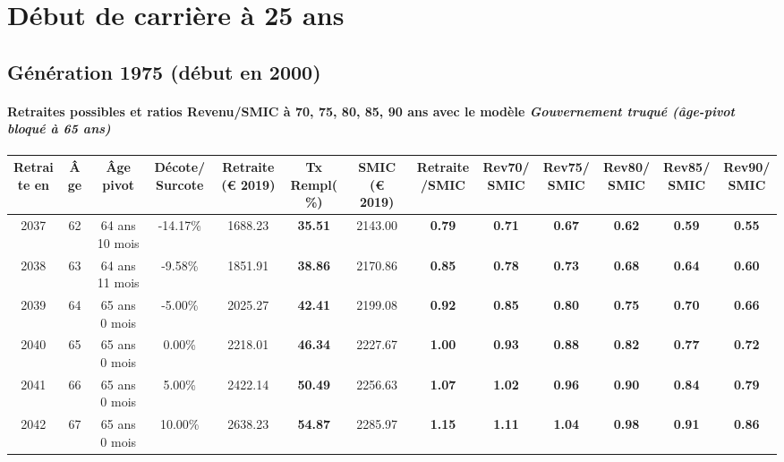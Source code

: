  \addto{\captionsenglish}{ \renewcommand{\mtctitle}{}} \setcounter{minitocdepth}{2} 
 \minitoc \newpage 

\section{Début de carrière à 25 ans} 

\subsection{Génération 1975 (début en 2000)} 

\paragraph{Retraites possibles et ratios Revenu/SMIC à 70, 75, 80, 85, 90 ans avec le modèle \emph{Gouvernement truqué (âge-pivot bloqué à 65 ans)}}  
 
{ \scriptsize \begin{center} 
\begin{tabular}[htb]{|c|c||c|c||c|c||c||c|c|c|c|c|c|} 
\hline 
 Retraite en &  Âge &  Âge pivot &  Décote/Surcote &  Retraite (\euro{} 2019) &  Tx Rempl(\%) &  SMIC (\euro{} 2019) &  Retraite/SMIC &  Rev70/SMIC &  Rev75/SMIC &  Rev80/SMIC &  Rev85/SMIC &  Rev90/SMIC \\ 
\hline \hline 
 2037 &  62 &  64 ans 10 mois &  -14.17\% &  1688.23 &  {\bf 35.51} &  2143.00 &  {\bf {\color{red} 0.79}} &  {\bf {\color{red} 0.71}} &  {\bf {\color{red} 0.67}} &  {\bf {\color{red} 0.62}} &  {\bf {\color{red} 0.59}} &  {\bf {\color{red} 0.55}} \\ 
\hline 
 2038 &  63 &  64 ans 11 mois &  -9.58\% &  1851.91 &  {\bf 38.86} &  2170.86 &  {\bf {\color{red} 0.85}} &  {\bf {\color{red} 0.78}} &  {\bf {\color{red} 0.73}} &  {\bf {\color{red} 0.68}} &  {\bf {\color{red} 0.64}} &  {\bf {\color{red} 0.60}} \\ 
\hline 
 2039 &  64 &  65 ans 0 mois &  -5.00\% &  2025.27 &  {\bf 42.41} &  2199.08 &  {\bf {\color{red} 0.92}} &  {\bf {\color{red} 0.85}} &  {\bf {\color{red} 0.80}} &  {\bf {\color{red} 0.75}} &  {\bf {\color{red} 0.70}} &  {\bf {\color{red} 0.66}} \\ 
\hline 
 2040 &  65 &  65 ans 0 mois &  0.00\% &  2218.01 &  {\bf 46.34} &  2227.67 &  {\bf {\color{red} 1.00}} &  {\bf {\color{red} 0.93}} &  {\bf {\color{red} 0.88}} &  {\bf {\color{red} 0.82}} &  {\bf {\color{red} 0.77}} &  {\bf {\color{red} 0.72}} \\ 
\hline 
 2041 &  66 &  65 ans 0 mois &  5.00\% &  2422.14 &  {\bf 50.49} &  2256.63 &  {\bf 1.07} &  {\bf 1.02} &  {\bf {\color{red} 0.96}} &  {\bf {\color{red} 0.90}} &  {\bf {\color{red} 0.84}} &  {\bf {\color{red} 0.79}} \\ 
\hline 
 2042 &  67 &  65 ans 0 mois &  10.00\% &  2638.23 &  {\bf 54.87} &  2285.97 &  {\bf 1.15} &  {\bf 1.11} &  {\bf 1.04} &  {\bf {\color{red} 0.98}} &  {\bf {\color{red} 0.91}} &  {\bf {\color{red} 0.86}} \\ 
\hline 
\hline 
\end{tabular} 
\end{center} } 
